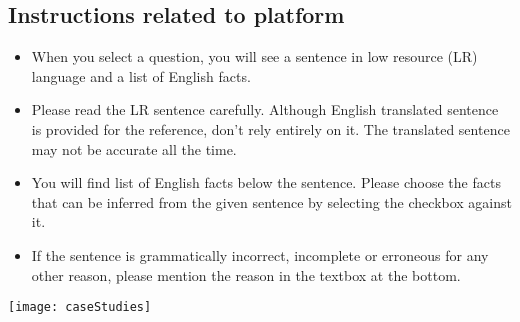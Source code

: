 \documentclass[11pt]{article}
\begin{document}
\subsection{Instructions related to platform}
\begin{itemize}
    \item When you select a question, you will see a sentence in low resource (LR) language and a list of English facts.
\item Please read the LR sentence carefully. Although English translated sentence is provided for the reference, don't rely entirely on it. The translated sentence may not be accurate all the time.
\item You will find list of English facts below the sentence. Please choose the facts that can be inferred from the given sentence by selecting the checkbox against it.
\item If the sentence is grammatically incorrect,  incomplete or erroneous for any other reason, please mention the reason in the textbox at the bottom.
\end{itemize}

\begin{figure*}[!t]
    \centering
    \texttt{[image: caseStudies]}
    \label{tab:caseStudies}
\end{figure*}
\end{document}
